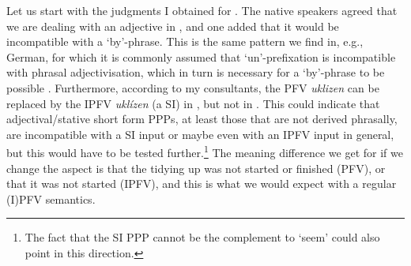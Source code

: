 \documentclass[output=paper,colorlinks,citecolor=brown]{langscibook}
\begin{document}
Let us start with the judgments I obtained for %
. 
%
%
The native speakers agreed that we are dealing with an adjective in , and one added that it would be incompatible with a `by'-phrase. This is the same pattern we find in, e.g., German, for which it is commonly assumed that `un'-prefixation is incompatible with phrasal adjectivisation, which in turn is necessary for a `by'-phrase to be possible \citep[see, e.g.,][]{rapp96,gehrkeonli}. Furthermore, according to my consultants, the PFV \textit{uklizen} can be replaced by the IPFV \textit{uklízen} (a SI) in , but not in . This could indicate that adjectival/stative short form PPPs, at least those that are not derived phrasally, are incompatible with a SI input or maybe even with an IPFV input in general, but this would have to be tested further.\footnote{The fact that the SI PPP cannot be the complement to `seem'  \citep[adapted from][99]{Biskup2019} could also point in this direction. 


\z 

} The meaning difference we get for  if we change the aspect is that the tidying up was not started or finished (PFV), or that it was not started (IPFV), and this is what we would expect with a regular (I)PFV semantics.
\end{document}
